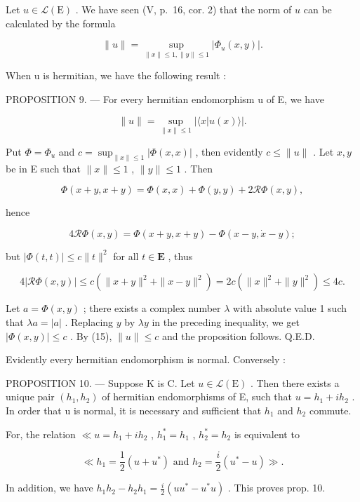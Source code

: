 Let \(u \in \mathcal{L}(\mathrm{E})\) . We have seen (V, p.~16, cor. 2) that the norm of \(u\) can be calculated by the formula

\[
\| u \| = \sup _ {\| x \| \leqslant 1, \| y \| \leqslant 1} \left| \Phi_ {u} (x, y) \right|.\tag{15}
\]

When u is hermitian, we have the following result :

PROPOSITION 9. --- For every hermitian endomorphism u of E, we have

\[
\| u \| = \sup _ {\| x \| \leqslant 1} | \langle x | u (x) \rangle |.\tag{16}
\]

Put \(\Phi = \Phi_{u}\) and \(c = \sup_{\| x\| \leqslant 1}|\Phi (x,x)|\) , then evidently \(c\leqslant \| u\|\) . Let \(x,y\) be in E such that \(\| x\| \leqslant 1\) , \(\| y\| \leqslant 1\) . Then

\[
\Phi (x + y, x + y) = \Phi (x, x) + \Phi (y, y) + 2 \mathscr {R} \Phi (x, y),
\]

hence

\[
4 \mathscr {R} \Phi (x, y) = \Phi (x + y, x + y) - \Phi (x - y, \dot {x} - y);
\]

but \(|\Phi(t, t)| \leqslant c \|t\|^2\) for all \(t \in \mathbf{E}\) , thus

\[
4 \left| \mathcal {R} \Phi (x, y) \right| \leqslant c \left(\| x + y \| ^ {2} + \| x - y \| ^ {2}\right) = 2 c \left(\| x \| ^ {2} + \| y \| ^ {2}\right) \leqslant 4 c.
\]

Let \(a = \Phi(x, y)\) ; there exists a complex number \(\lambda\) with absolute value 1 such that \(\lambda a = |a|\) . Replacing \(y\) by \(\lambda y\) in the preceding inequality, we get \(|\Phi(x,y)| \leqslant c\) . By (15), \(\|u\| \leqslant c\) and the proposition follows. Q.E.D.

Evidently every hermitian endomorphism is normal. Conversely :

PROPOSITION 10. --- Suppose K is C. Let \(u \in \mathcal{L}(\mathrm{E})\) . Then there exists a unique pair \((h_1, h_2)\) of hermitian endomorphisms of E, such that \(u = h_1 + ih_2\) . In order that u is normal, it is necessary and sufficient that \(h_1\) and \(h_2\) commute.

For, the relation \(\ll u = h_1 + ih_2\) , \(h_1^* = h_1\) , \(h_2^* = h_2\) is equivalent to

\[
\ll h _ {1} = \frac {1}{2} (u + u ^ {*}) \text { and } h _ {2} = \frac {i}{2} (u ^ {*} - u) \gg .
\]

In addition, we have \(h_1h_2 - h_2h_1 = \frac{i}{2} (uu^* - u^*u)\) . This proves prop. 10.

